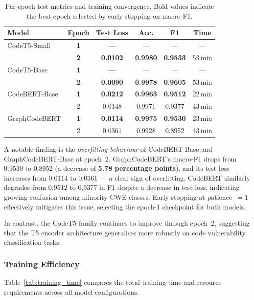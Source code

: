 \begin{table}[t]
\centering
\caption{Per-epoch test metrics and training convergence.  Bold values
         indicate the best epoch selected by early stopping on macro-F1.}
\label{tab:convergence}
\begin{tabular}{lccccc}
\hline
\textbf{Model} & \textbf{Epoch} & \textbf{Test Loss} & \textbf{Acc.} & \textbf{F1} & \textbf{Time} \\
\hline
CodeT5-Small      & \textbf{1} & \textbf{---}  & ---   & ---   & ---  \\
                  & \textbf{2} & \textbf{0.0102} & \textbf{0.9980} & \textbf{0.9533} & 53\,min \\
\hline
CodeT5-Base       & \textbf{1} & \textbf{---}  & ---   & ---   & ---  \\
                  & \textbf{2} & \textbf{0.0090} & \textbf{0.9978} & \textbf{0.9605} & 53\,min \\
\hline
CodeBERT-Base     & \textbf{1} & \textbf{0.0212} & \textbf{0.9963} & \textbf{0.9512} & 22\,min \\
                  & 2 & 0.0148 & 0.9971 & 0.9377 & 43\,min \\
\hline
GraphCodeBERT     & \textbf{1} & \textbf{0.0114} & \textbf{0.9975} & \textbf{0.9530} & 23\,min \\
                  & 2 & 0.0361 & 0.9928 & 0.8952 & 43\,min \\
\hline
\end{tabular}
\end{table}

A notable finding is the \emph{overfitting behaviour} of CodeBERT-Base and
GraphCodeBERT-Base at epoch~2.  GraphCodeBERT's macro-F1 drops from
0.9530 to 0.8952 (a decrease of \textbf{5.78 percentage points}), and its
test loss increases from 0.0114 to 0.0361 --- a clear sign of overfitting.
CodeBERT similarly degrades from 0.9512 to 0.9377 in F1 despite a decrease
in test loss, indicating growing confusion among minority CWE classes.
Early stopping at patience~$= 1$ effectively mitigates this issue,
selecting the epoch-1 checkpoint for both models.

In contrast, the CodeT5 family continues to improve through epoch~2,
suggesting that the T5 encoder architecture generalises more robustly on
code vulnerability classification tasks.

\subsubsection{Training Efficiency}
Table~\ref{tab:training_time} compares the total training time and
resource requirements across all model configurations.

